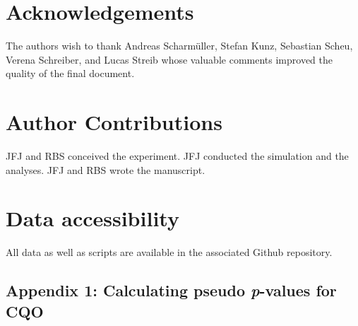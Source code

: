 \documentclass[a4paper,11pt]{article}
\begin{document}
\section*{Acknowledgements}
The authors wish to thank Andreas Scharmüller, Stefan Kunz, Sebastian Scheu, Verena Schreiber, and Lucas Streib whose valuable comments  improved the quality of the final document. 
\section*{Author Contributions}
JFJ and RBS conceived the experiment. JFJ conducted the simulation and the analyses. JFJ and RBS wrote the manuscript.
\section*{Data accessibility}
All data as well as scripts are available in the associated Github repository. 


\newpage
\setcounter{figure}{0}
\setcounter{table}{0}

\subsection*{Appendix 1: Calculating pseudo \textit{p}-values for CQO}
 
\end{document}
